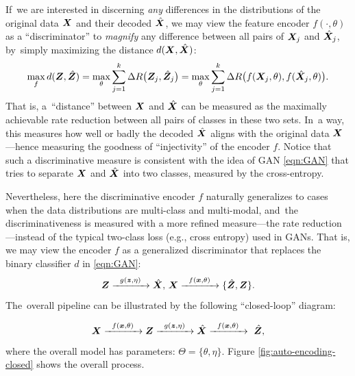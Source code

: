 \documentclass[../../book-main.tex]{subfiles}
\begin{document}
{If~we are interested in discerning {\em any} differences in the distributions of the original data $\bm{X}$ and their decoded $\hat {\bm{X}}$, we may view the feature encoder $f(\cdot, \theta)$ as a ``discriminator'' to {\em magnify} any difference between all pairs of $\bm{X}_j$ and $\hat {\bm{X}}_j$, by~simply maximizing the distance $d(\bm{X}, \hat {\bm{X}})$:
\begin{equation}
\max_f d(\bm{Z}, \hat {\bm{Z}}) = \max_{\theta} \sum_{j=1}^k \Delta R\big(\bm{Z}_j, \hat{\bm{Z}}_j\big) = \max_{\theta} \sum_{j=1}^k \Delta R\big(f(\bm{X}_j,\theta), f(\hat{\bm{X}}_j,\theta)\big).
    \label{eqn:max-distance}
\end{equation}
That is, a~``distance'' between $\bm{X}$ and $\hat {\bm{X}}$ can be measured as the maximally achievable rate reduction between all pairs of classes in these two sets. In~a way, this measures how well or badly the decoded $\hat {\bm{X}}$ aligns with the original data $\bm{X}$---hence measuring the goodness of ``injectivity'' of the encoder $f$. Notice that such a discriminative measure is consistent with the idea of GAN \eqref{eqn:GAN} that tries to separate $\bm{X}$ and $\hat {\bm{X}}$ into two classes, measured by the cross-entropy. 

Nevertheless, here the  discriminative encoder $f$ naturally generalizes to cases when the data distributions are multi-class and multi-modal, and~the discriminativeness is measured with a more refined measure---the rate reduction---instead of the typical two-class loss (e.g., cross entropy) used in GANs. That is, we may view the encoder $f$ as a generalized discriminator that replaces the binary classifier $d$ in \eqref{eqn:GAN}:
\begin{equation}
 \bm{Z} \xrightarrow{\hspace{2mm} g(\bm{z},\eta) \hspace{2mm}} \hat {\bm{X}}, \, \bm{X} \xrightarrow{\hspace{2mm} f(\bm{x}, \theta)\hspace{2mm}} \{\hat {\bm{Z}}, \bm{Z}\}.
 \label{eqn:closed-loop-GAN}
\end{equation}
The~overall pipeline can be illustrated by the following ``closed-loop''  diagram:}
\begin{equation}
    \bm{X} \xrightarrow{\hspace{2mm} f(\bm{x}, \theta)\hspace{2mm}} \bm{Z} \xrightarrow{\hspace{2mm} g(\bm{z},\eta) \hspace{2mm}} \hat {\bm{X}} \xrightarrow{\hspace{2mm} f(\bm{x}, \theta)\hspace{2mm}} \ \hat {\bm{Z}}, 
\end{equation}
where the overall model has parameters: $\Theta = \{\theta, \eta\}$. Figure \ref{fig:auto-encoding-closed} shows the overall process.  
\end{document}
